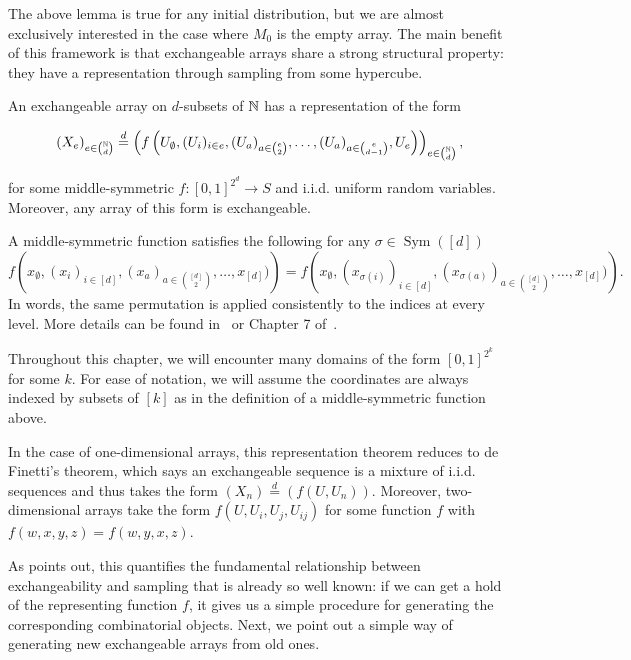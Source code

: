 \noindent The above lemma is true for any initial distribution, but we
are almost exclusively interested in the case where $M_0$ is the empty array.
The main benefit of this framework is that exchangeable arrays share a
strong structural property: they have
a representation through sampling from some hypercube.


\begin{theorem}
\label{thm:representation_theorem_of_exchangeable_arrays}
\noindent An exchangeable array on $d$-subsets of $\mathbb{N}$ has a representation of the form

\[\left(X_e\right)_{e \in \binom{\mathbb{N}}{d}} \overset{d}{=}
\left(f\left(U_\emptyset, (U_i)_{i \in e}, (U_a)_{a \in \binom{e}{2}}, \ldots,
(U_a)_{a \in \binom{e}{d-1}}, U_e\right)\right)_{e \in \binom{\mathbb{N}}{d}},\]

\noindent for some middle-symmetric $f:[0,1]^{2^d} \to S$ and i.i.d. uniform random variables. Moreover, any array of this form is exchangeable.

\end{theorem}

\noindent A middle-symmetric function satisfies the following for any $\sigma \in \operatorname{Sym}([d])$
%
    \[f\left(x_\emptyset, (x_i)_{i \in [d]}, (x_a)_{a \in \binom{[d]}{2}}, \ldots, x_{[d]})\right) = f\left(x_\emptyset, (x_{\sigma(i)})_{i \in [d]}, (x_{\sigma(a)})_{a \in \binom{[d]}{2}}, \ldots,  x_{[d]})\right).\]
%
In words, the same permutation is applied consistently to the indices at every level.
More details can be found in~\cite{austin2013_exchangeable_random_arrays} or Chapter 7 of~\cite{kallenberg2005_probabilistic_symmetries}.

Throughout this chapter, we will encounter many domains of the form $[0,1]^{2^k}$ for some $k$. For ease of notation, we will assume the coordinates are always indexed by subsets of $[k]$ as in the definition of a middle-symmetric function above.

In the case of one-dimensional arrays, this representation theorem reduces to de Finetti's theorem, which says an exchangeable sequence is a mixture of i.i.d. sequences and thus takes the form $(X_n)\overset{d}{=}(f(U,U_n))$. Moreover, two-dimensional arrays take the form $f(U,U_i,U_j,U_{ij})$ for some function $f$ with $f(w,x,y,z)=f(w,y,x,z)$.

As \cite{aldous2010_more_uses_of_exchangeability} points out, this quantifies the fundamental relationship between
exchangeability and sampling that is already so well known: if we can get a hold of the representing function
$f$, it gives us a simple procedure for generating the corresponding combinatorial objects.
Next, we point out a simple way of generating new exchangeable arrays from old ones.

